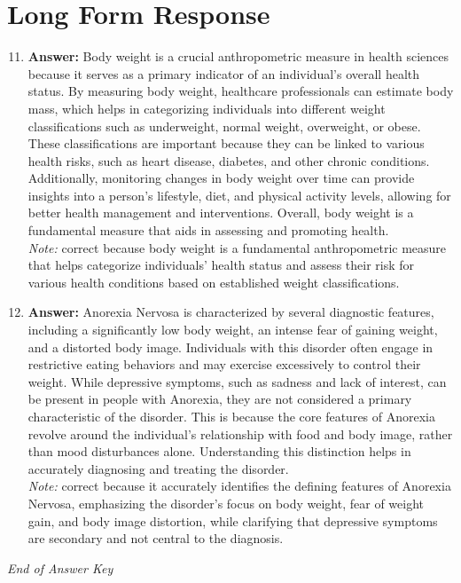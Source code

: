 \documentclass[12pt]{article}
\begin{document}
\section*{Long Form Response}
\begin{enumerate}[label=\arabic*.]
\setcounter{enumi}{10}
\item \textbf{Answer:} Body weight is a crucial anthropometric measure in health sciences because it serves as a primary indicator of an individual's overall health status. By measuring body weight, healthcare professionals can estimate body mass, which helps in categorizing individuals into different weight classifications such as underweight, normal weight, overweight, or obese. These classifications are important because they can be linked to various health risks, such as heart disease, diabetes, and other chronic conditions. Additionally, monitoring changes in body weight over time can provide insights into a person's lifestyle, diet, and physical activity levels, allowing for better health management and interventions. Overall, body weight is a fundamental measure that aids in assessing and promoting health.
\\ \textit{Note:} correct because body weight is a fundamental anthropometric measure that helps categorize individuals' health status and assess their risk for various health conditions based on established weight classifications.
\item \textbf{Answer:} Anorexia Nervosa is characterized by several diagnostic features, including a significantly low body weight, an intense fear of gaining weight, and a distorted body image. Individuals with this disorder often engage in restrictive eating behaviors and may exercise excessively to control their weight. While depressive symptoms, such as sadness and lack of interest, can be present in people with Anorexia, they are not considered a primary characteristic of the disorder. This is because the core features of Anorexia revolve around the individual's relationship with food and body image, rather than mood disturbances alone. Understanding this distinction helps in accurately diagnosing and treating the disorder.
\\ \textit{Note:} correct because it accurately identifies the defining features of Anorexia Nervosa, emphasizing the disorder's focus on body weight, fear of weight gain, and body image distortion, while clarifying that depressive symptoms are secondary and not central to the diagnosis.
\end{enumerate}

\vfill
\noindent\textit{End of Answer Key}
\end{document}
